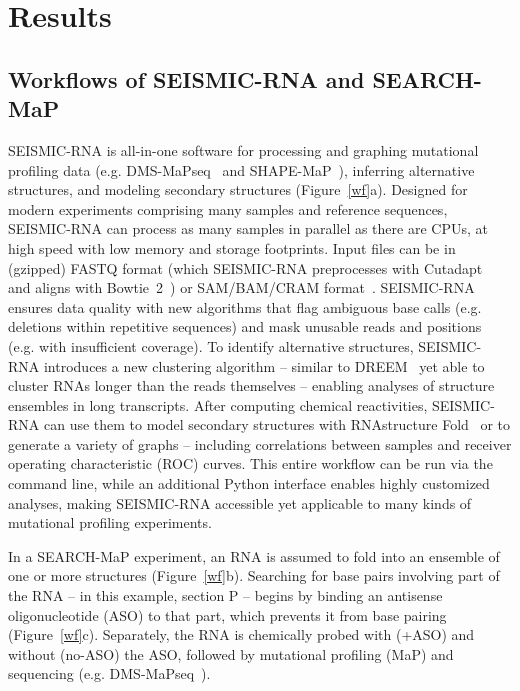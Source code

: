 \documentclass[main.tex]{subfiles}
\begin{document}
\section{Results}

\subsection{Workflows of SEISMIC-RNA and SEARCH-MaP}


SEISMIC-RNA is all-in-one software for processing and graphing mutational profiling data (e.g. DMS-MaPseq~\cite{Zubradt2016} and SHAPE-MaP~\cite{Siegfried2014}), inferring alternative structures, and modeling secondary structures (Figure~\ref{wf}a).
Designed for modern experiments comprising many samples and reference sequences, SEISMIC-RNA can process as many samples in parallel as there are CPUs, at high speed with low memory and storage footprints.
Input files can be in (gzipped) FASTQ format (which SEISMIC-RNA preprocesses with Cutadapt~\cite{Martin2011} and aligns with Bowtie~2~\cite{Langmead2012}) or SAM/BAM/CRAM format~\cite{Li2009}.
SEISMIC-RNA ensures data quality with new algorithms that flag ambiguous base calls (e.g. deletions within repetitive sequences) and mask unusable reads and positions (e.g. with insufficient coverage).
To identify alternative structures, SEISMIC-RNA introduces a new clustering algorithm -- similar to DREEM~\cite{Tomezsko2020} yet able to cluster RNAs longer than the reads themselves -- enabling analyses of structure ensembles in long transcripts.
After computing chemical reactivities, SEISMIC-RNA can use them to model secondary structures with RNAstructure Fold~\cite{Reuter2010,Cordero2012} or to generate a variety of graphs -- including correlations between samples and receiver operating characteristic (ROC) curves.
This entire workflow can be run via the command line, while an additional Python interface enables highly customized analyses, making SEISMIC-RNA accessible yet applicable to many kinds of mutational profiling experiments.

In a SEARCH-MaP experiment, an RNA is assumed to fold into an ensemble of one or more structures (Figure~\ref{wf}b).
Searching for base pairs involving part of the RNA -- in this example, section P -- begins by binding an antisense oligonucleotide (ASO) to that part, which prevents it from base pairing (Figure~\ref{wf}c).
Separately, the RNA is chemically probed with (+ASO) and without (no-ASO) the ASO, followed by mutational profiling (MaP) and sequencing (e.g. DMS-MaPseq~\cite{Zubradt2016}).
\end{document}
